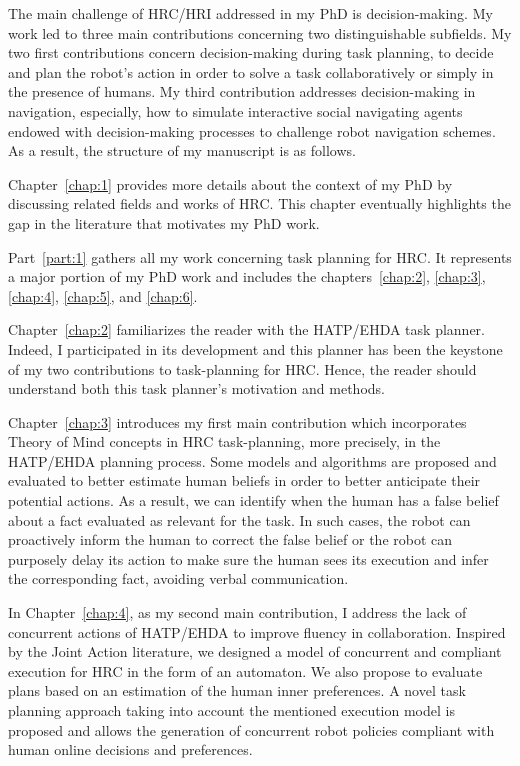 
The main challenge of HRC/HRI addressed in my PhD is decision-making. My work led to three main contributions concerning two distinguishable subfields. My two first contributions concern decision-making during task planning, to decide and plan the robot's action in order to solve a task collaboratively or simply in the presence of humans. My third contribution addresses decision-making in navigation, especially, how to simulate interactive social navigating agents endowed with decision-making processes to challenge robot navigation schemes.
As a result, the structure of my manuscript is as follows.

Chapter~\ref{chap:1} provides more details about the context of my PhD by discussing related fields and works of HRC. This chapter eventually highlights the gap in the literature that motivates my PhD work.

Part~\ref{part:1} gathers all my work concerning task planning for HRC. It represents a major portion of my PhD work and includes the chapters~\ref{chap:2}, \ref{chap:3}, \ref{chap:4}, \ref{chap:5}, and \ref{chap:6}.

Chapter~\ref{chap:2} familiarizes the reader with the HATP/EHDA task planner. Indeed, I participated in its development and this planner has been the keystone of my two contributions to task-planning for HRC. Hence, the reader should understand both this task planner's motivation and methods.

Chapter~\ref{chap:3} introduces my first main contribution which incorporates Theory of Mind concepts in HRC task-planning, more precisely, in the HATP/EHDA planning process.
Some models and algorithms are proposed and evaluated to better estimate human beliefs in order to better anticipate their potential actions. As a result, we can identify when the human has a false belief about a fact evaluated as relevant for the task. In such cases, the robot can proactively inform the human to correct the false belief or the robot can purposely delay its action to make sure the human sees its execution and infer the corresponding fact, avoiding verbal communication. 

In Chapter~\ref{chap:4}, as my second main contribution, I address the lack of concurrent actions of HATP/EHDA to improve fluency in collaboration. Inspired by the Joint Action literature, we designed a model of concurrent and compliant execution for HRC in the form of an automaton. We also propose to evaluate plans based on an estimation of the human inner preferences. A novel task planning approach taking into account the mentioned execution model is proposed and allows the generation of concurrent robot policies compliant with human online decisions and preferences. 

